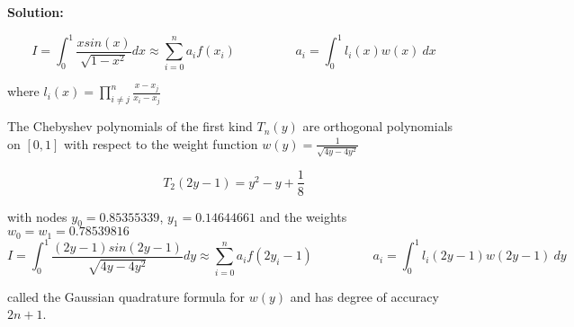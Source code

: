 \documentclass[a4paper,11pt]{report}
\begin{document}
\begin{enumerate}
\begin{itemize}
    \textbf{Solution:}

    \begin{equation*}
    I = \int_{0}^{1} \frac{x sin(x)}{\sqrt{1-x^2}} dx \approx \sum_{i=0}^{n} a_{i} f(x_{i}) \hspace{2cm} a_{i} = \int_{0}^{1} l_{i}(x) w(x)\ dx
    \end{equation*}

    where $l_{i}(x) = \displaystyle \prod_{i \neq j}^{n} \frac{x - x_{j}}{x_{i} - x_{j}}$

    The Chebyshev polynomials of the first kind $T_{n}(y)$ are orthogonal polynomials on $[0, 1]$ with respect to the weight function $w(y) = \displaystyle \frac{1}{\sqrt{4y-4y^2}}$

    \begin{equation*}
    T_{2}(2y-1) = y^{2} - y + \frac{1}{8}
    \end{equation*}
    
    with nodes $y_{0} = 0.85355339$, $y_{1} = 0.14644661$ and the weights $w_{0} = w_{1} = 0.78539816$
    \begin{equation*}
    I = \int_{0}^{1} \frac{(2y-1) sin(2y-1)}{\sqrt{4y-4y^2}} dy \approx \sum_{i=0}^{n} a_{i} f(2y_{i} - 1) \hspace{2cm} a_{i} = \int_{0}^{1} l_{i}(2y-1) w(2y-1)\ dy
    \end{equation*} 

    called the Gaussian quadrature formula for $w(y)$ and has degree of accuracy $2n + 1$.
 

\end{itemize}
\end{enumerate}
\end{document}
